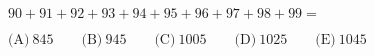 

$90+91+92+93+94+95+96+97+98+99=$


$\text{(A)}\ 845 \qquad \text{(B)}\ 945 \qquad \text{(C)}\ 1005 \qquad \text{(D)}\ 1025 \qquad \text{(E)}\ 1045$
